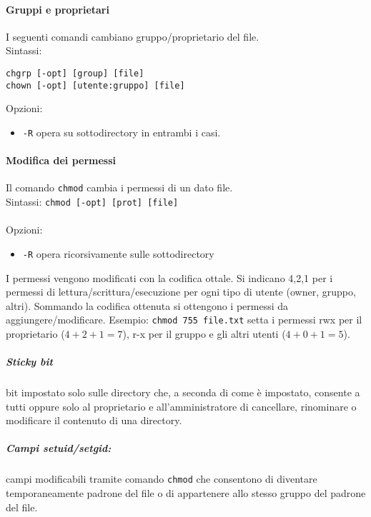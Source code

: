 \documentclass[a4paper, 10pt]{article}
\begin{document}
\paragraph{Gruppi e proprietari} I seguenti comandi cambiano gruppo/proprietario del file.\\
Sintassi:
\begin{verbatim}
chgrp [-opt] [group] [file]
chown [-opt] [utente:gruppo] [file]
\end{verbatim}
Opzioni:
\begin{itemize}
\item \verb|-R| opera su sottodirectory in entrambi i casi.
\end{itemize}

\paragraph{Modifica dei permessi} Il comando \verb|chmod| cambia i permessi di un dato file.\\
Sintassi:
\verb|chmod [-opt] [prot] [file]| \\ \\
Opzioni:
\begin{itemize}
\item \verb|-R| opera ricorsivamente sulle sottodirectory
\end{itemize}
I permessi vengono modificati con la codifica ottale. Si indicano 4,2,1 per i permessi di lettura/scrittura/esecuzione per ogni tipo di utente (owner, gruppo, altri).
Sommando la codifica ottenuta si ottengono i permessi da aggiungere/modificare.
Esempio: \verb|chmod 755 file.txt| setta i permessi rwx per il proprietario ($4+2+1=7$), r-x per il gruppo e gli altri utenti ($4+0+1=5$).

\subparagraph{Sticky bit} bit impostato solo sulle directory che, a seconda di come è impostato, consente a tutti oppure solo al proprietario e all'amministratore di cancellare, rinominare o modificare il contenuto di una directory.

\subparagraph{Campi setuid/setgid:} campi modificabili tramite comando \verb|chmod| che consentono di diventare temporaneamente padrone del file o di appartenere allo stesso gruppo del padrone del file.
\end{document}
